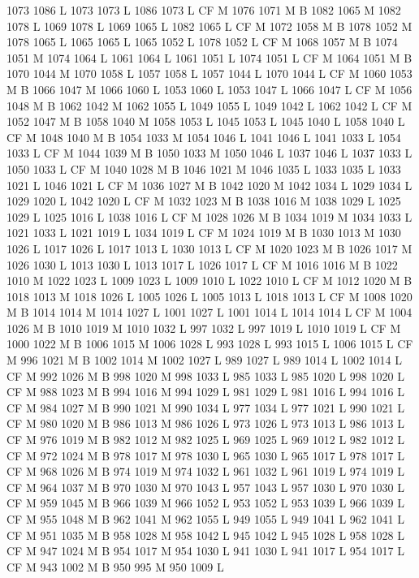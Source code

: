 {{{{{{{{{{{{{{{{{{{{{{{{{{{1073 1086 L
1073 1073 L
1086 1073 L
CF M
1076 1071 M B
1082 1065 M 1082 1078 L
1069 1078 L
1069 1065 L
1082 1065 L
CF M
1072 1058 M B
1078 1052 M 1078 1065 L
1065 1065 L
1065 1052 L
1078 1052 L
CF M
1068 1057 M B
1074 1051 M 1074 1064 L
1061 1064 L
1061 1051 L
1074 1051 L
CF M
1064 1051 M B
1070 1044 M 1070 1058 L
1057 1058 L
1057 1044 L
1070 1044 L
CF M
1060 1053 M B
1066 1047 M 1066 1060 L
1053 1060 L
1053 1047 L
1066 1047 L
CF M
1056 1048 M B
1062 1042 M 1062 1055 L
1049 1055 L
1049 1042 L
1062 1042 L
CF M
1052 1047 M B
1058 1040 M 1058 1053 L
1045 1053 L
1045 1040 L
1058 1040 L
CF M
1048 1040 M B
1054 1033 M 1054 1046 L
1041 1046 L
1041 1033 L
1054 1033 L
CF M
1044 1039 M B
1050 1033 M 1050 1046 L
1037 1046 L
1037 1033 L
1050 1033 L
CF M
1040 1028 M B
1046 1021 M 1046 1035 L
1033 1035 L
1033 1021 L
1046 1021 L
CF M
1036 1027 M B
1042 1020 M 1042 1034 L
1029 1034 L
1029 1020 L
1042 1020 L
CF M
1032 1023 M B
1038 1016 M 1038 1029 L
1025 1029 L
1025 1016 L
1038 1016 L
CF M
1028 1026 M B
1034 1019 M 1034 1033 L
1021 1033 L
1021 1019 L
1034 1019 L
CF M
1024 1019 M B
1030 1013 M 1030 1026 L
1017 1026 L
1017 1013 L
1030 1013 L
CF M
1020 1023 M B
1026 1017 M 1026 1030 L
1013 1030 L
1013 1017 L
1026 1017 L
CF M
1016 1016 M B
1022 1010 M 1022 1023 L
1009 1023 L
1009 1010 L
1022 1010 L
CF M
1012 1020 M B
1018 1013 M 1018 1026 L
1005 1026 L
1005 1013 L
1018 1013 L
CF M
1008 1020 M B
1014 1014 M 1014 1027 L
1001 1027 L
1001 1014 L
1014 1014 L
CF M
1004 1026 M B
1010 1019 M 1010 1032 L
997 1032 L
997 1019 L
1010 1019 L
CF M
1000 1022 M B
1006 1015 M 1006 1028 L
993 1028 L
993 1015 L
1006 1015 L
CF M
996 1021 M B
1002 1014 M 1002 1027 L
989 1027 L
989 1014 L
1002 1014 L
CF M
992 1026 M B
998 1020 M 998 1033 L
985 1033 L
985 1020 L
998 1020 L
CF M
988 1023 M B
994 1016 M 994 1029 L
981 1029 L
981 1016 L
994 1016 L
CF M
984 1027 M B
990 1021 M 990 1034 L
977 1034 L
977 1021 L
990 1021 L
CF M
980 1020 M B
986 1013 M 986 1026 L
973 1026 L
973 1013 L
986 1013 L
CF M
976 1019 M B
982 1012 M 982 1025 L
969 1025 L
969 1012 L
982 1012 L
CF M
972 1024 M B
978 1017 M 978 1030 L
965 1030 L
965 1017 L
978 1017 L
CF M
968 1026 M B
974 1019 M 974 1032 L
961 1032 L
961 1019 L
974 1019 L
CF M
964 1037 M B
970 1030 M 970 1043 L
957 1043 L
957 1030 L
970 1030 L
CF M
959 1045 M B
966 1039 M 966 1052 L
953 1052 L
953 1039 L
966 1039 L
CF M
955 1048 M B
962 1041 M 962 1055 L
949 1055 L
949 1041 L
962 1041 L
CF M
951 1035 M B
958 1028 M 958 1042 L
945 1042 L
945 1028 L
958 1028 L
CF M
947 1024 M B
954 1017 M 954 1030 L
941 1030 L
941 1017 L
954 1017 L
CF M
943 1002 M B
950 995 M 950 1009 L
}}}}}}}}}}}}}}}}}}}}}}}}}}}
